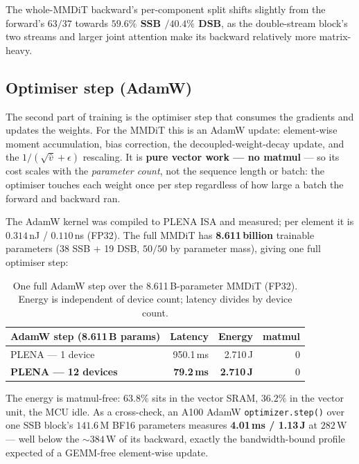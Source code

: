 \documentclass[11pt]{report}
\begin{document}
The whole-MMDiT backward's per-component split shifts slightly from the
forward's $63/37$ towards \textbf{$59.6\%$ SSB $/ 40.4\%$ DSB}, as the
double-stream block's two streams and larger joint attention make its
backward relatively more matrix-heavy.

\subsection{Optimiser step (AdamW)}
\label{sec:results-adamw}

The second part of training is the optimiser step that consumes the
gradients and updates the weights. For the MMDiT this is an AdamW update:
element-wise moment accumulation, bias correction, the decoupled-weight-decay
update, and the $1/(\sqrt{\hat v}+\epsilon)$ rescaling. It is \textbf{pure
vector work --- no matmul} --- so its cost scales with the \emph{parameter
count}, not the sequence length or batch: the optimiser touches each weight
once per step regardless of how large a batch the forward and backward ran.

The AdamW kernel was compiled to PLENA ISA and measured; per element it is
$0.314$\,nJ / $0.110$\,ns (FP32). The full MMDiT has \textbf{8.611\,billion}
trainable parameters (38 SSB + 19 DSB, $50/50$ by parameter mass), giving
one full optimiser step:

\begin{table}[h]
\centering
\caption{One full AdamW step over the 8.611\,B-parameter MMDiT (FP32).
Energy is independent of device count; latency divides by device count.}
\label{tab:adamw}
\begin{tabular}{@{}lrrr@{}}
\toprule
AdamW step (8.611\,B params) & Latency & Energy & matmul \\
\midrule
PLENA --- 1 device & 950.1\,ms & 2.710\,J & 0 \\
\textbf{PLENA --- 12 devices} & \textbf{79.2\,ms} & \textbf{2.710\,J} & 0 \\
\bottomrule
\end{tabular}
\end{table}

The energy is matmul-free: $63.8\%$ sits in the vector SRAM, $36.2\%$ in the
vector unit, the MCU idle. As a cross-check, an A100 AdamW
\texttt{optimizer.step()} over one SSB block's $141.6$\,M BF16 parameters
measures \textbf{4.01\,ms / 1.13\,J} at $282$\,W --- well below the
${\sim}384$\,W of its backward, exactly the bandwidth-bound profile expected
of a GEMM-free element-wise update.
\end{document}
